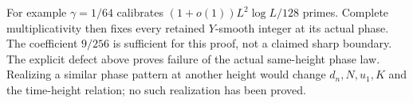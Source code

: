 For example \(\gamma=1/64\) calibrates
\((1+o(1))L^2\log L/128\) primes. Complete multiplicativity then fixes
every retained \(Y\)-smooth integer at its actual phase.
The coefficient \(9/256\) is sufficient for this proof, not a claimed
sharp boundary. The explicit defect above proves failure of the actual
same-height phase law. Realizing a similar phase pattern at another
height would change \(d_n,N,u_1,K\) and the time-height relation; no
such realization has been proved.
